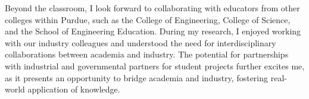 \documentclass[10pt]{article}
\renewcommand*\paragraph[1]{}
\begin{document}
Beyond the classroom, I look forward to collaborating with educators from other colleges within Purdue, such as the College of Engineering, College of Science, and the School of Engineering Education. During my research, I enjoyed working with our industry colleagues and understood the need for interdisciplinary collaborations between academia and industry. The potential for partnerships with industrial and governmental partners for student projects further excites me, as it presents an opportunity to bridge academia and industry, fostering real-world application of knowledge.



\paragraph{1 and P1) Earned doctoral degree in computer science or a closely related field}
\end{document}
